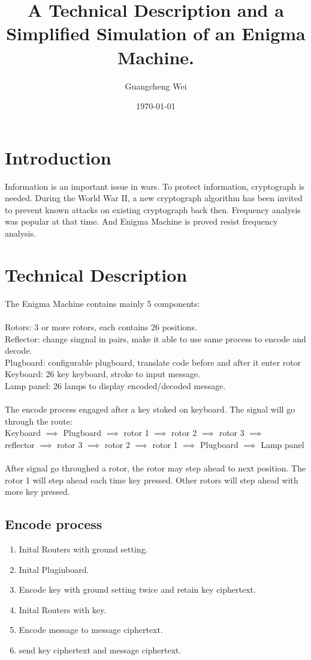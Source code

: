\documentclass[11pt,a4paper]{article}
\begin{document}
\title{A Technical Description and a Simplified Simulation of an Enigma Machine.}
\author{Guangcheng Wei}
\date{\normalsize\today}
\maketitle

\section{Introduction}
Information is an important issue in wars. To protect information, cryptograph is needed.
During the World War II, a new cryptograph algorithm has been invited to prevent known attacks on existing cryptograph back then. Frequency analysis was popular at that time. And Enigma Machine is proved resist frequency analysis.\cite{wiki:Enigma}
\section{Technical Description}
The Enigma Machine contains mainly 5 components:\\\\
Rotors: 3 or more rotors, each contains 26 positions.\\
Reflector: change singnal in pairs, make it able to use same process to encode and decode.\\
Plugboard: configurable plugboard, translate code before and after it enter rotor\\
Keyboard: 26 key keyboard, stroke to input message.\\
Lamp panel: 26 lamps to display encoded/decoded message.\\\\
The encode process engaged after a key stoked on keyboard.
The signal will go through the route:\\
Keyboard $\implies$ Plugboard $\implies$ rotor 1 $\implies$ rotor 2 $\implies$ rotor 3 $\implies$\\
reflector $\implies$ rotor 3 $\implies$ rotor 2 $\implies$ rotor 1 $\implies$ Plugboard $\implies$ Lamp panel\\\\
After signal go throughed a rotor, the rotor may step ahead to next position. The rotor 1 will step ahead each time key pressed. Other rotors will step ahead with more key pressed.

\subsection{Encode process}
\begin{enumerate}
\item Inital Routers with ground setting.
\item Inital Pluginboard.
\item Encode key with ground setting twice and retain key ciphertext.
\item Inital Routers with key.
\item Encode message to message ciphertext.
\item send key ciphertext and message ciphertext.
\end{enumerate}
\end{document}
